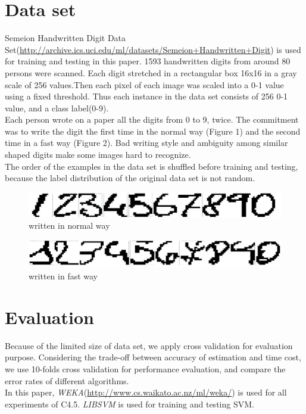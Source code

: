 \documentclass[a4paper,11pt]{article}
\begin{document}
\section{Data set}
Semeion Handwritten Digit Data Set(\url{http://archive.ics.uci.edu/ml/datasets/Semeion+Handwritten+Digit}) is used for training and testing in this paper. 1593 handwritten digits from around 80 persons were scanned. Each digit stretched in a rectangular box 16x16 in a gray scale of 256 values.Then each pixel of each image was scaled into a 0-1 value using a fixed threshold. Thus each instance in the data set consists of 256 0-1 value, and a class label(0-9).\\
Each person wrote on a paper all the digits from 0 to 9, twice. The commitment was to write the digit the first time in the normal way (Figure 1) and the second time in a fast way (Figure 2). Bad writing style and ambiguity among similar shaped digits make some images hard to recognize.\\
The order of the examples in the data set is shuffled before training and testing, because the label distribution of the original data set is not random.
\begin{figure}
\centering
\includegraphics[width=1.0\textwidth]{clear}
\caption{written in normal way}
\end{figure}

\begin{figure}
\centering
\includegraphics[width=1.0\textwidth]{unclear}
\caption{written in fast way}
\end{figure}

\section{Evaluation}

Because of the limited size of data set, we apply cross validation for evaluation purpose. Considering the trade-off between accuracy of estimation and time cost, we use 10-folds cross validation for performance evaluation, and compare the error rates of different algorithms.\\
In this paper, \emph{WEKA}(\url{http://www.cs.waikato.ac.nz/ml/weka/}) is used for all experiments of C4.5. \emph{LIBSVM}\cite{libsvm} is used for training and testing SVM.\\
\end{document}
